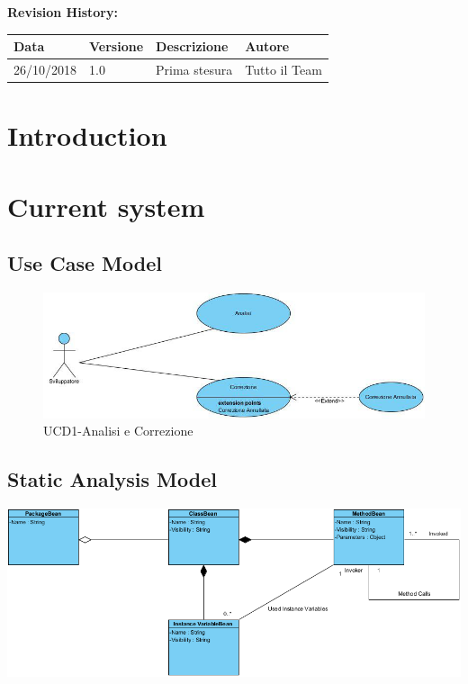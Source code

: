\documentclass[11pt]{article}
\begin{document}
	\textbf{Revision History:}
	\begin{table}[h]
		\centering
		\begin{tabularx}{0.9\textwidth}{|p{2cm}|l|X|p{3cm}|}
			\hline
			\textbf{Data} & \textbf{Versione} & \textbf{Descrizione} & \textbf{Autore} \\ \hline
			26/10/2018 & 1.0 & Prima stesura & Tutto il Team \\ \hline
		\end{tabularx}
	\end{table}
	
	\vfill
	\newpage
	
	\tableofcontents
	\newpage
	
	\section{Introduction}	   
	   	
	   	
	\section{Current system}
	
		
		\subsection{Use Case Model}		
			
			\begin{figure}[h!]
				\includegraphics[width=\columnwidth]{UseCaseDiagramCurrent.jpg}
				\caption{UCD1-Analisi e Correzione}
			\end{figure}
		
			
		
		\subsection{Static Analysis Model}
		
			\includegraphics[width=\columnwidth]{classDiagram.png}
			
\end{document}
